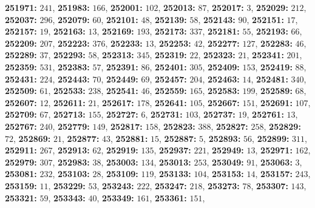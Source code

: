 \textsf{\bfseries 251971:} $241$, \textsf{\bfseries 251983:} $166$, \textsf{\bfseries 252001:} $102$, \textsf{\bfseries 252013:} $87$, \textsf{\bfseries 252017:} $3$, \textsf{\bfseries 252029:} $212$, \textsf{\bfseries 252037:} $296$, \textsf{\bfseries 252079:} $60$, \textsf{\bfseries 252101:} $48$, \textsf{\bfseries 252139:} $58$, \textsf{\bfseries 252143:} $90$, \textsf{\bfseries 252151:} $17$, \textsf{\bfseries 252157:} $19$, \textsf{\bfseries 252163:} $13$, \textsf{\bfseries 252169:} $193$, \textsf{\bfseries 252173:} $337$, \textsf{\bfseries 252181:} $55$, \textsf{\bfseries 252193:} $66$, \textsf{\bfseries 252209:} $207$, \textsf{\bfseries 252223:} $376$, \textsf{\bfseries 252233:} $13$, \textsf{\bfseries 252253:} $42$, \textsf{\bfseries 252277:} $127$, \textsf{\bfseries 252283:} $46$, \textsf{\bfseries 252289:} $37$, \textsf{\bfseries 252293:} $58$, \textsf{\bfseries 252313:} $345$, \textsf{\bfseries 252319:} $22$, \textsf{\bfseries 252323:} $21$, \textsf{\bfseries 252341:} $201$, \textsf{\bfseries 252359:} $531$, \textsf{\bfseries 252383:} $57$, \textsf{\bfseries 252391:} $86$, \textsf{\bfseries 252401:} $305$, \textsf{\bfseries 252409:} $153$, \textsf{\bfseries 252419:} $88$, \textsf{\bfseries 252431:} $224$, \textsf{\bfseries 252443:} $70$, \textsf{\bfseries 252449:} $69$, \textsf{\bfseries 252457:} $204$, \textsf{\bfseries 252463:} $14$, \textsf{\bfseries 252481:} $340$, \textsf{\bfseries 252509:} $61$, \textsf{\bfseries 252533:} $238$, \textsf{\bfseries 252541:} $46$, \textsf{\bfseries 252559:} $165$, \textsf{\bfseries 252583:} $199$, \textsf{\bfseries 252589:} $68$, \textsf{\bfseries 252607:} $12$, \textsf{\bfseries 252611:} $21$, \textsf{\bfseries 252617:} $178$, \textsf{\bfseries 252641:} $105$, \textsf{\bfseries 252667:} $151$, \textsf{\bfseries 252691:} $107$, \textsf{\bfseries 252709:} $67$, \textsf{\bfseries 252713:} $155$, \textsf{\bfseries 252727:} $6$, \textsf{\bfseries 252731:} $103$, \textsf{\bfseries 252737:} $19$, \textsf{\bfseries 252761:} $13$, \textsf{\bfseries 252767:} $240$, \textsf{\bfseries 252779:} $149$, \textsf{\bfseries 252817:} $158$, \textsf{\bfseries 252823:} $388$, \textsf{\bfseries 252827:} $258$, \textsf{\bfseries 252829:} $72$, \textsf{\bfseries 252869:} $21$, \textsf{\bfseries 252877:} $43$, \textsf{\bfseries 252881:} $15$, \textsf{\bfseries 252887:} $5$, \textsf{\bfseries 252893:} $56$, \textsf{\bfseries 252899:} $311$, \textsf{\bfseries 252911:} $267$, \textsf{\bfseries 252913:} $62$, \textsf{\bfseries 252919:} $135$, \textsf{\bfseries 252937:} $221$, \textsf{\bfseries 252949:} $13$, \textsf{\bfseries 252971:} $162$, \textsf{\bfseries 252979:} $307$, \textsf{\bfseries 252983:} $38$, \textsf{\bfseries 253003:} $134$, \textsf{\bfseries 253013:} $253$, \textsf{\bfseries 253049:} $91$, \textsf{\bfseries 253063:} $3$, \textsf{\bfseries 253081:} $232$, \textsf{\bfseries 253103:} $28$, \textsf{\bfseries 253109:} $119$, \textsf{\bfseries 253133:} $104$, \textsf{\bfseries 253153:} $14$, \textsf{\bfseries 253157:} $243$, \textsf{\bfseries 253159:} $11$, \textsf{\bfseries 253229:} $53$, \textsf{\bfseries 253243:} $222$, \textsf{\bfseries 253247:} $218$, \textsf{\bfseries 253273:} $78$, \textsf{\bfseries 253307:} $143$, \textsf{\bfseries 253321:} $59$, \textsf{\bfseries 253343:} $40$, \textsf{\bfseries 253349:} $161$, \textsf{\bfseries 253361:} $151$, 
